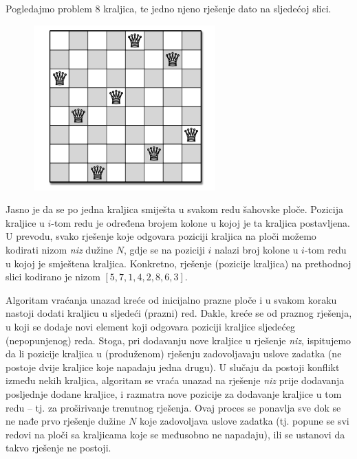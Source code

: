 \begin{solution}
           
      Pogledajmo problem 8 kraljica, te jedno njeno rješenje dato na sljedećoj slici.  
      \begin{figure}[H]
      	\centering
      	\includegraphics[width=200pt,height=180pt]{slike/n-queen-problem.png}
       
  \end{figure}

Jasno je da se po jedna kraljica smiješta u svakom redu šahovske ploče. Pozicija kraljice u $i$-tom redu je određena brojem kolone u kojoj je ta kraljica postavljena. U prevodu, svako rješenje koje odgovara poziciji kraljica na ploči možemo kodirati nizom \emph{niz} dužine $N$, gdje se na poziciji $i$ nalazi broj kolone u $i$-tom redu u kojoj je smještena kraljica. Konkretno, rješenje (pozicije kraljica)  na prethodnoj slici kodirano je nizom $[5, 7, 1, 4, 2, 8, 6, 3]$. 

Algoritam vraćanja unazad kreće od inicijalno prazne ploče i u svakom koraku nastoji dodati kraljicu u sljedeći (prazni) red. Dakle, kreće se od praznog rješenja, u koji se dodaje novi element   koji odgovara poziciji kraljice sljedećeg (nepopunjenog) reda. Stoga, pri dodavanju nove kraljice u rješenje \emph{niz}, ispitujemo da li pozicije kraljica u (produženom) rješenju  zadovoljavaju uslove zadatka (ne  postoje dvije kraljice koje napadaju jedna drugu). U slučaju da postoji konflikt između nekih kraljica, algoritam se vraća unazad na rješenje \emph{niz} prije dodavanja posljednje dodane kraljice, i razmatra nove pozicije za dodavanje kraljice u tom redu -- tj. za proširivanje trenutnog rješenja.  Ovaj proces se ponavlja sve dok se ne nađe prvo rješenje dužine $N$ koje zadovoljava uslove zadatka (tj. popune se svi redovi na ploči sa kraljicama koje se međusobno ne napadaju), ili se ustanovi da takvo rješenje ne postoji. 


\end{solution}
